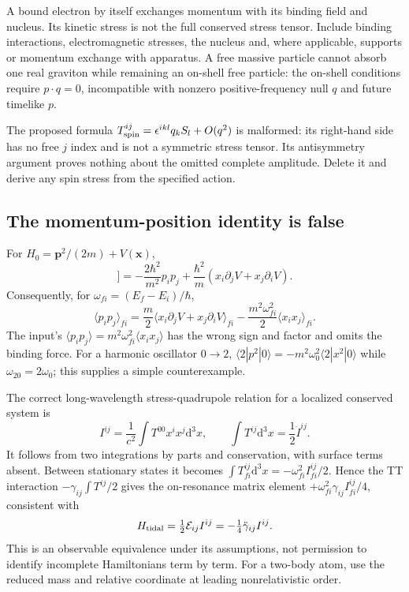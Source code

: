 \documentclass[a4paper,11pt]{article}
\newcommand{\dd}{\mathrm{d}}
\newcommand{\calE}{\mathcal E}
\begin{document}
A bound electron by itself exchanges momentum with its binding field and nucleus. Its kinetic stress is not the full conserved stress tensor. Include binding interactions, electromagnetic stresses, the nucleus and, where applicable, supports or momentum exchange with apparatus. A free massive particle cannot absorb one real graviton while remaining an on-shell free particle: the on-shell conditions require $p\cdot q=0$, incompatible with nonzero positive-frequency null $q$ and future timelike $p$.

The proposed formula $T^{ij}_{\rm spin}=\epsilon^{ikl}q_kS_l+O(q^2)$ is malformed: its right-hand side has no free $j$ index and is not a symmetric stress tensor. Its antisymmetry argument proves nothing about the omitted complete amplitude. Delete it and derive any spin stress from the specified action.

\subsection{The momentum-position identity is false}

For $H_0=\bm p^2/(2m)+V(\bm x)$,
\begin{equation}
 [H_0,[H_0,x_ix_j]]
 =-\frac{2\hbar^2}{m^2}p_ip_j
 +\frac{\hbar^2}{m}(x_i\partial_jV+x_j\partial_iV).
\end{equation}
Consequently, for $\omega_{fi}=(E_f-E_i)/\hbar$,
\begin{equation}
 \boxed{\langle p_ip_j\rangle_{fi}
 =\frac m2\langle x_i\partial_jV+x_j\partial_iV\rangle_{fi}
 -\frac{m^2\omega_{fi}^2}{2}\langle x_ix_j\rangle_{fi}.}
 \label{eq:commutator}
\end{equation}
The input's $\langle p_ip_j\rangle=m^2\omega_{fi}^2\langle x_ix_j\rangle$ has the wrong sign and factor and omits the binding force. For a harmonic oscillator $0\to2$, $\langle2|p^2|0\rangle=-m^2\omega_0^2\langle2|x^2|0\rangle$ while $\omega_{20}=2\omega_0$; this supplies a simple counterexample.

The correct long-wavelength stress-quadrupole relation for a localized conserved system is
\begin{equation}
 I^{ij}=\frac1{c^2}\int T^{00}x^ix^j\dd^3x,\qquad
 \int T^{ij}\dd^3x=\frac12\ddot I^{ij}.
\end{equation}
It follows from two integrations by parts and conservation, with surface terms absent. Between stationary states it becomes $\int T^{ij}_{fi}\dd^3x=-\omega_{fi}^2 I^{ij}_{fi}/2$. Hence the TT interaction $-\gamma_{ij}\int T^{ij}/2$ gives the on-resonance matrix element $+\omega_{fi}^2\gamma_{ij}I^{ij}_{fi}/4$, consistent with
\begin{equation}
 H_{\rm tidal}=\tfrac12\calE_{ij}I^{ij}=-\tfrac14\ddot\gamma_{ij}I^{ij}.
 \label{eq:tidalH}
\end{equation}
This is an observable equivalence under its assumptions, not permission to identify incomplete Hamiltonians term by term. For a two-body atom, use the reduced mass and relative coordinate at leading nonrelativistic order.
\end{document}
